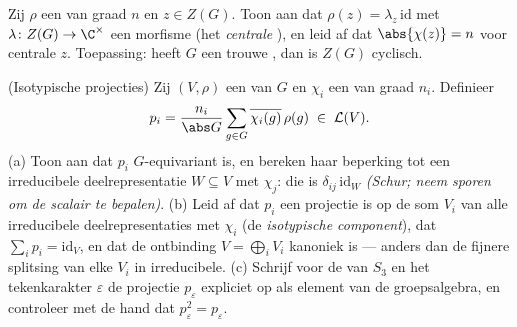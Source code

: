 \begin{exercise}[$\star\star$]\label{exo:b3:representations:10}
Zij $\rho$ een  van graad $n$ en $z \in
Z(G)$. Toon aan dat $\rho(z) = \lambda_z\,\mathrm{id}$ met
$\lambda \colon Z(G) \to \C^\times$ een morfisme (het
\emph{centrale }), en leid af dat $\abs{\chi(z)} = n$ voor
centrale $z$. Toepassing: heeft $G$ een trouwe , dan is $Z(G)$ cyclisch.
\end{exercise}

\begin{exercise}[$\star\star$]\label{exo:b3:representations:11}
(Isotypische projecties) Zij $(V, \rho)$ een  van $G$
en $\chi_i$ een   van graad $n_i$. Definieer
\[
p_i = \frac{n_i}{\abs G}\sum_{g\in G}
\overline{\chi_i(g)}\,\rho(g) \;\in\; \mathcal L(V).
\]
(a) Toon aan dat $p_i$ $G$-equivariant is, en bereken haar
beperking tot een irreducibele deelrepresentatie $W \subseteq V$
met  $\chi_j$: die is $\delta_{ij}\, \mathrm{id}_W$
\emph{(Schur; neem sporen om de scalair te bepalen)}.
(b) Leid af dat $p_i$ een projectie is op de som $V_i$ van alle
irreducibele deelrepresentaties met  $\chi_i$ (de
\emph{isotypische component}), dat $\sum_ip_i = \mathrm{id}_V$, en
dat de ontbinding $V = \bigoplus_iV_i$ kanoniek is --- anders dan
de fijnere splitsing van elke $V_i$ in irreducibele.
(c) Schrijf voor de  van $S_3$ en het
tekenkarakter $\varepsilon$ de projectie $p_\varepsilon$
expliciet op als element van de groepsalgebra, en controleer met
de hand dat $p_\varepsilon^2 = p_\varepsilon$.
\end{exercise}

